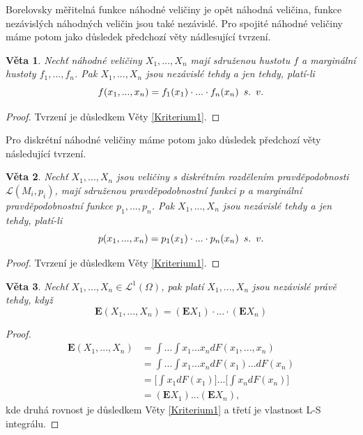\documentclass[a4]{report}
\newtheorem{theorem}{Věta}
\theoremstyle{definition}
\begin{document}
{Borelovsky měřitelná funkce náhodné veličiny je opět náhodná veličina, funkce nezávislých náhodných veličin jsou také nezávislé. Pro spojité náhodné veličiny máme potom jako důsledek předchozí věty nádlesující tvrzení.
\begin{theorem}
Nechť náhodné veličiny $X_{1}, ..., X_{n}$ mají sdruženou hustotu $f$ a marginální hustoty $f_{1}, ..., f_{n}$. Pak $X_{1}, ..., X_{n}$ jsou nezávislé tehdy a jen tehdy, platí-li
\begin{equation}
f(x_{1}, ..., x_{n}) = f_{1}(x_{1})\cdot ... \cdot f_{n}(x_{n}) \enskip s. \enskip v.
\end{equation}
\end{theorem}
\begin{proof}
Tvrzení je důsledkem Věty \ref{Kriterium1}.
\end{proof}

Pro diskrétní náhodné veličiny máme potom jako důsledek předchozí věty následující tvrzení.
\begin{theorem}
Nechť $X_{1}, ..., X_{n}$ jsou veličiny s diskrétním rozdělením pravděpodobnosti $\mathcal{L}(M_{i}, p_{i})$, mají sdruženou pravděpodobnostní funkci $p$ a marginální pravděpodobnostní funkce $p_{1}, ..., p_{n}$. Pak $X_{1}, ..., X_{n}$ jsou nezávislé tehdy a jen tehdy, platí-li
\begin{equation}
p(x_{1}, ..., x_{n}) = p_{1}(x_{1})\cdot ... \cdot p_{n}(x_{n}) \enskip s. \enskip v.
\end{equation}
\end{theorem}
\begin{proof}
Tvrzení je důsledkem Věty \ref{Kriterium1}.
\end{proof}

\begin{theorem}\label{VetaSeStrHod}
Nechť $X_{1}, ..., X_{n} \in \mathcal{L}^{1}(\Omega)$, pak platí $X_{1}, ..., X_{n}$ jsou nezávislé právě tehdy, když
\begin{equation}
\mathbf{E}(X_{1}, ..., X_{n}) = (\mathbf{E}X_{1}) \cdot ... \cdot (\mathbf{E}X_{n}) 
\end{equation}
\end{theorem}
\begin{proof}
\begin{align*}
\mathbf{E}(X_{1}, ..., X_{n})&= \int ... \int x_{1}...x_{n}dF(x_{1}, ..., x_{n}) \\
&= \int ... \int x_{1}...x_{n}dF(x_{1})...dF(x_{n}) \\
&= \bigg[ \int x_{1}dF(x_{1}) \bigg]...\bigg[ \int x_{n}dF(x_{n}) \bigg]\\ 
&= (\mathbf{E}X_{1})  ... (\mathbf{E}X_{n}),
\end{align*}
kde druhá rovnost je důsledkem Věty \ref{Kriterium1} a třetí je vlastnost L-S integrálu.
\end{proof}

}
\end{document}
